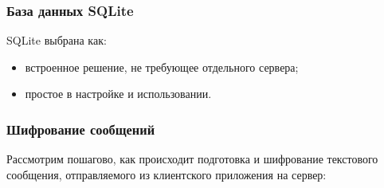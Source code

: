 \subsubsection{База данных SQLite}

SQLite выбрана как:
\begin{itemize}
	\item встроенное решение, не требующее отдельного сервера;
	\item простое в настройке и использовании.
\end{itemize}

\subsubsection{Шифрование сообщений}

Рассмотрим пошагово, как происходит подготовка и шифрование текстового сообщения, отправляемого из клиентского приложения на сервер:

